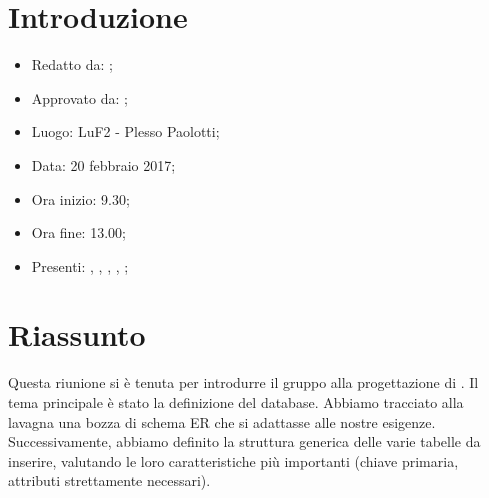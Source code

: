 \section{Introduzione}

	\begin{itemize}
		\item Redatto da: \MC;
		\item Approvato da: \AS;
		\item Luogo: LuF2 - Plesso Paolotti;
		\item Data: 20 febbraio 2017;
		\item Ora inizio: 9.30;
		\item Ora fine: 13.00;
		\item Presenti: \AS, \DAN, \DS, \MC, \NS;		
	\end{itemize}

\section{Riassunto}
Questa riunione si è tenuta per introdurre il gruppo alla progettazione di \progetto. Il tema principale è stato la definizione del database. Abbiamo tracciato alla lavagna una bozza di schema ER che si adattasse alle nostre esigenze. Successivamente, abbiamo definito la struttura generica delle varie tabelle da inserire, valutando le loro caratteristiche più importanti (chiave primaria, attributi strettamente necessari).